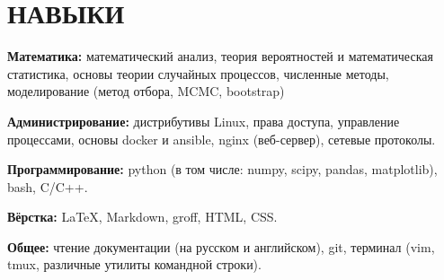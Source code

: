 \section{НАВЫКИ}

\begin{description}

    \setlength\itemsep{-0.4em}

    \item{\bfseries Математика:}
        математический анализ, теория вероятностей и математическая статистика,
        основы теории случайных процессов, численные методы, моделирование
        (метод отбора, MCMC, bootstrap)

    \item{\bfseries Администрирование:}
        дистрибутивы Linux, права доступа, управление процессами, основы docker
        и ansible, nginx (веб-сервер), сетевые протоколы.
    
    \item{\bfseries Программирование:}
        python (в том числе: numpy, scipy, pandas, matplotlib), bash, C/C++.
    
    \item{\bfseries Вёрстка:}
        \LaTeX, Markdown, groff, HTML, CSS.

    \item{\bfseries Общее:}
        чтение документации (на русском и английском), git, терминал (vim,
        tmux, различные утилиты командной строки).

\end{description}
    
    \vspace{.7em}
